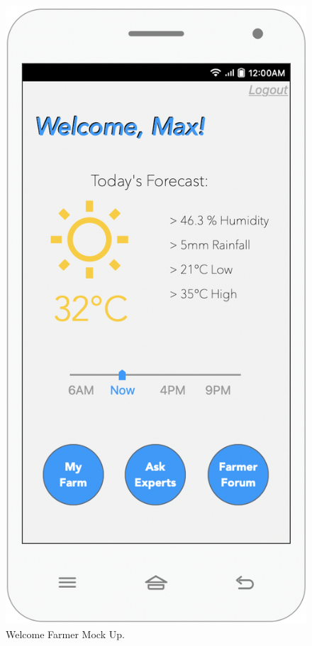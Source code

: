 \begin{multicols}{3}
 
\begin{figure}[H]

 \centering
\includegraphics[scale=0.35]{../images_diagrams/mock_ups/welcomefarmer100.png}
\caption{\label{fig:mock_farmer}Welcome Farmer Mock Up.}
 \end{figure}
 

\end{multicols}
